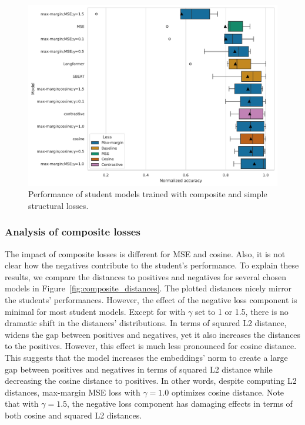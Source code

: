 \begin{figure}

  \includegraphics[width=\textwidth]{./img/structural_both_losses.pdf}

  \caption{Performance of student models trained with composite and simple
  structural losses.}

  \label{fig:structural_composite_vs_simple}
\end{figure}

\subsubsection{Analysis of composite losses}\label{section:composite_analysis}

The impact of composite losses is different for MSE and cosine. Also, it is not
clear how the negatives contribute to the student's performance. To explain
these results, we compare the distances to positives and negatives for several
chosen models in Figure~\ref{fig:composite_distances}. The plotted distances
nicely mirror the students' performances. However, the effect of the negative
loss component is minimal for most student models. Except for
 with $\gamma$ set to 1 or 1.5, there is no dramatic
shift in the distances' distributions. In terms of squared L2 distance,
 widens the gap between positives and
negatives, yet it also increases the distances to the positives. However, this
effect is much less pronounced for cosine distance. This suggests that the model increases the
embeddings' norm to create a large gap between positives and negatives in terms
of squared L2 distance while decreasing the cosine distance to positives. In
other words, despite computing L2 distances, max-margin MSE loss with
$\gamma=1.0$ optimizes cosine distance. Note that with $\gamma=1.5$, the
negative loss component has damaging effects in terms of both cosine and
squared L2 distances.


